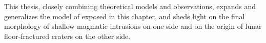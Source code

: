 This thesis,  closely combining  theoretical models  and observations,
expands and generalizes the model of \citet{Michaut:2011kg} exposed in
this  chapter, and  sheds light  on  the final  morphology of  shallow
magmatic  intrusions  on   one  side  and  on  the   origin  of  lunar
floor-fractured craters on the other side.


